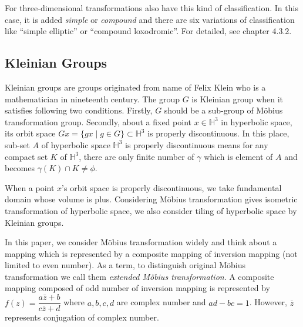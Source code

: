 For three-dimensional transformations also have this kind of
classification.
In this case, it is added \textit{simple} or \textit{compound} and
there are six variations of classification like ``simple elliptic'' or
``compound loxodromic''.
For detailed, see chapter 4.3.2.



\subsection{Kleinian Groups}

Kleinian groups are groups originated from name of Felix Klein who is
a mathematician in nineteenth century.
The group $G$ is Kleinian group when it satisfies following two
conditions. 
Firstly, $G$ should be a sub-group of M\"obius transformation group.
Secondly, about a fixed point $x\in\mathbb{H}^3$ in hyperbolic space,
its orbit space $Gx = \{ gx \mid g\in G\}\subset \mathbb{H}^3$
is properly discontinuous.
In this place, sub-set $A$ of hyperbolic space $\mathbb{H}^3$
is properly discontinuous means
for any compact set $K$ of $\mathbb{H}^3$,
there are only finite number of $\gamma$ which is element of $A$
and becomes $\gamma (K) \cap K \neq \phi$.

When a point $x$'s orbit space is properly discontinuous, we take
fundamental domain whose volume is plus.
Considering M\"obius transformation gives isometric transformation of
hyperbolic space, we also consider tiling of hyperbolic space by
Kleinian groups. 

In this paper, we consider M\"obius transformation widely and
think about a mapping which is represented by a composite mapping of
inversion mapping (not limited to even number).
As a term, to distinguish original M\"obius transformation
we call them \textit{extended M\"obius transformation}.
A composite mapping composed of odd number of inversion mapping
is represented by $f(z)=\dfrac{a{\bar{z}}+b}{c{\bar{z}}+d}$ where
$a, b, c, d$ are complex number and $ad-bc = 1$.
However, $\overline{z}$ represents conjugation of complex number.

